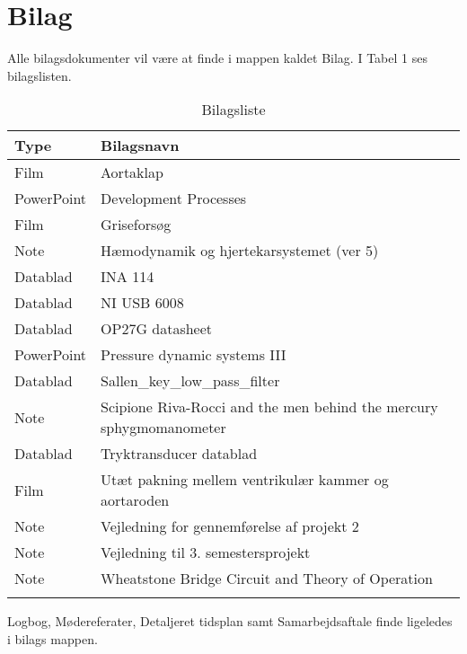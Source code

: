 \chapter{Bilag}
Alle bilagsdokumenter vil være at finde i mappen kaldet Bilag. I Tabel 1  ses bilagslisten. 

 
\begin{longtabu} to 
	\textbf{Type} & \textbf{Bilagsnavn} \\[-1ex]
	\midrule
	 Film 		& Aortaklap \\[-1ex]
	 PowerPoint	&  Development Processes \\[-1ex]
	 Film		&  Griseforsøg \\[-1ex]
	 Note 		&  Hæmodynamik og hjertekarsystemet (ver 5) \\[-1ex]
	 Datablad 	&  INA 114 \\[-1ex]
	 Datablad	&  NI USB 6008 \\[-1ex]
	 Datablad 	&  OP27G datasheet \\[-1ex]
	 PowerPoint &  Pressure dynamic systems III \\[-1ex]
	 Datablad	&  Sallen\_key\_low\_pass\_filter \\[-1ex]
	 Note		&  Scipione Riva-Rocci and the men behind the mercury sphygmomanometer \\[-1ex]
	 Datablad	&  Tryktransducer datablad \\[-1ex]
	 Film 		&  Utæt pakning mellem ventrikulær kammer og aortaroden \\[-1ex]
	 Note		&  Vejledning for gennemførelse af projekt 2 \\[-1ex]
	 Note 		&  Vejledning til 3. semestersprojekt \\[-1ex]
	 Note &  Wheatstone Bridge Circuit and Theory of Operation \\[-1ex]
	 	
	\caption{Bilagsliste}
\end{longtabu}


Logbog, Mødereferater, Detaljeret tidsplan samt Samarbejdsaftale finde ligeledes i bilags mappen. 


